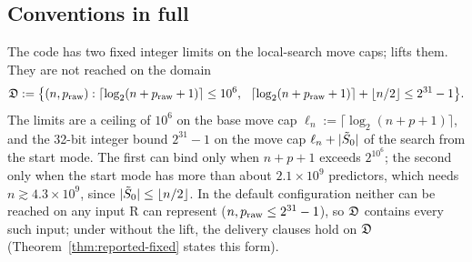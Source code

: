 \subsection{Conventions in full}\label{app:conventions}

The code has two fixed integer limits on the local-search move caps;  lifts them. They are not reached on the
domain
\[
  \Dom:=\big\{(n,\praw):\lceil\log_2(n+\praw+1)\rceil\le10^6,\ \ \lceil\log_2(n+\praw+1)\rceil+\lfloor n/2\rfloor\le2^{31}-1\big\}.
\]
The limits are a ceiling of $10^6$ on the base move cap $\ell_n:=\lceil\log_2(n+p+1)\rceil$, and the 32-bit integer bound
$2^{31}-1$ on the move cap $\ell_n+\lvert \tilde S_0\rvert$ of the search from the start mode. The first can bind only when $n+p+1$
exceeds $2^{10^6}$; the second only when the start mode has more than about $2.1\times10^9$ predictors, which needs
$n\gtrsim4.3\times10^9$, since $\lvert \tilde S_0\rvert\le\lfloor n/2\rfloor$. In the default configuration neither can be reached on
any input R can represent ($n,p_{\mathrm{raw}}\le2^{31}-1$), so $\mathfrak D$ contains every such input; under  without the lift,
the delivery clauses hold on $\mathfrak D$ (Theorem~\ref{thm:reported-fixed} states this form).

